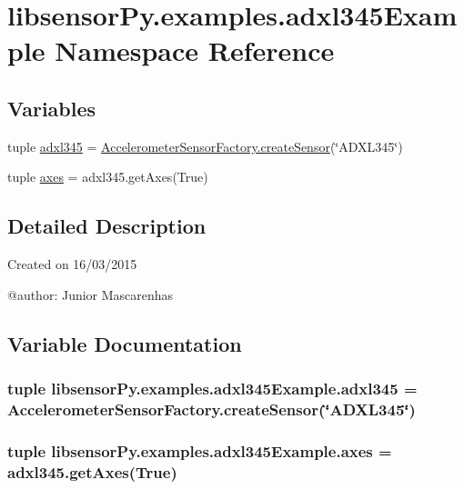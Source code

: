 \hypertarget{namespacelibsensorPy_1_1examples_1_1adxl345Example}{}\section{libsensor\+Py.\+examples.\+adxl345\+Example Namespace Reference}
\label{namespacelibsensorPy_1_1examples_1_1adxl345Example}
\subsection*{Variables}
\begin{DoxyCompactItemize}
\item 
tuple \hyperlink{namespacelibsensorPy_1_1examples_1_1adxl345Example_a20fda7d2a0f8e8a2ec2d93f4717d888d}{adxl345} = \hyperlink{classconcretefactory_1_1accelerometerSensorFactory_1_1AccelerometerSensorFactory_acc779765811f2da3b7a212550936b63b}{Accelerometer\+Sensor\+Factory.\+create\+Sensor}(\char`\"{}A\+D\+X\+L345\char`\"{})
\item 
tuple \hyperlink{namespacelibsensorPy_1_1examples_1_1adxl345Example_a7b6d799e5dcf91e04317cc5909a85d6b}{axes} = adxl345.\+get\+Axes(True)
\end{DoxyCompactItemize}


\subsection{Detailed Description}
\begin{DoxyVerb}Created on 16/03/2015

@author: Junior Mascarenhas
\end{DoxyVerb}
 

\subsection{Variable Documentation}
\hypertarget{namespacelibsensorPy_1_1examples_1_1adxl345Example_a20fda7d2a0f8e8a2ec2d93f4717d888d}{}
\subsubsection[{adxl345}]{\setlength{\rightskip}{0pt plus 5cm}tuple libsensor\+Py.\+examples.\+adxl345\+Example.\+adxl345 = {\bf Accelerometer\+Sensor\+Factory.\+create\+Sensor}(\char`\"{}A\+D\+X\+L345\char`\"{})}\label{namespacelibsensorPy_1_1examples_1_1adxl345Example_a20fda7d2a0f8e8a2ec2d93f4717d888d}
\hypertarget{namespacelibsensorPy_1_1examples_1_1adxl345Example_a7b6d799e5dcf91e04317cc5909a85d6b}{}
\subsubsection[{axes}]{\setlength{\rightskip}{0pt plus 5cm}tuple libsensor\+Py.\+examples.\+adxl345\+Example.\+axes = adxl345.\+get\+Axes(True)}\label{namespacelibsensorPy_1_1examples_1_1adxl345Example_a7b6d799e5dcf91e04317cc5909a85d6b}
